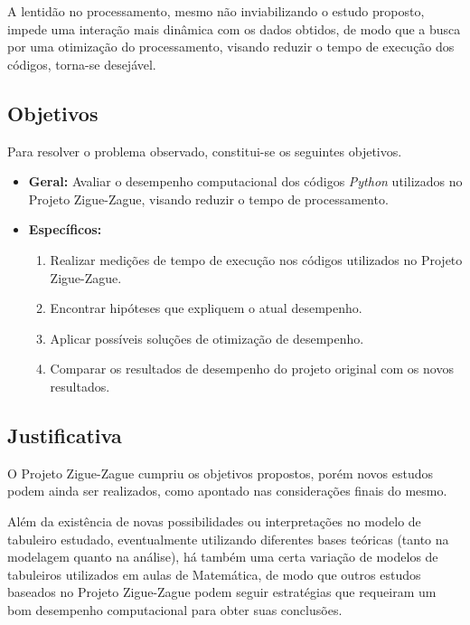\documentclass[12pt]{article}
\begin{document}

A lentidão no processamento, mesmo não inviabilizando o estudo proposto, impede uma interação mais dinâmica com os dados obtidos, de modo que a busca por uma otimização do processamento, visando reduzir o tempo de execução dos códigos, torna-se desejável.

\subsection{Objetivos}
\label{objetivos}

Para resolver o problema observado, constitui-se os seguintes objetivos.


\begin{itemize}
	\item \textbf{Geral:} Avaliar o desempenho computacional dos códigos \textit{Python} utilizados no Projeto Zigue-Zague, visando reduzir o tempo de processamento.
	\item \textbf{Específicos:}
	\begin{enumerate}
		\item Realizar medições de tempo de execução nos códigos utilizados no Projeto Zigue-Zague.
		\item Encontrar hipóteses que expliquem o atual desempenho.
		\item Aplicar possíveis soluções de otimização de desempenho.
		\item Comparar os resultados de desempenho do projeto original com os novos resultados.
	\end{enumerate}
\end{itemize}

\subsection{Justificativa}
\label{justificativa}

O Projeto Zigue-Zague cumpriu os objetivos propostos, porém novos estudos podem ainda ser realizados, como apontado nas considerações finais do mesmo.

Além da existência de novas possibilidades ou interpretações no modelo de tabuleiro estudado, eventualmente utilizando diferentes bases teóricas (tanto na modelagem quanto na análise), há também uma certa variação de modelos de tabuleiros utilizados em aulas de Matemática, de modo que outros estudos baseados no Projeto Zigue-Zague podem seguir estratégias que requeiram um bom desempenho computacional para obter suas conclusões.
\end{document}
